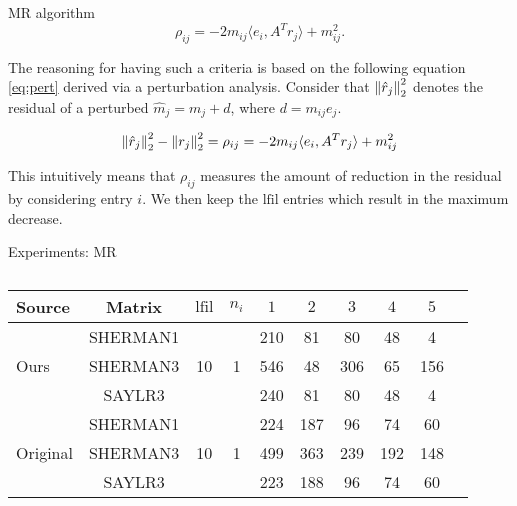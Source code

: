 \documentclass[paper=A4, fontsize=11pt]{scrartcl}
\let\originalleft\left
\let\originalright\right
\renewcommand{\left}{\mathopen{}\mathclose\bgroup\originalleft}
\renewcommand{\right}{\aftergroup\egroup\originalright}
\theoremstyle{remark}
\begin{document}
\begin{section}{MR algorithm}
	\begin{equation}\label{eq:rho}
	\rho_{i j}=-2 m_{i j}\langle e_{i}, A^{T} r_{j}\rangle+m_{i j}^{2}.
	\end{equation}


The reasoning for having such a criteria is based on the following equation \eqref{eq:pert} derived via a perturbation analysis.
Consider that $\left\|\hat{r}_{j}\right\|_{2}^{2}$ denotes the residual of a perturbed $\hat{m}_{j} = m_j + d$, where $d = m_{ij} e_j$.

\begin{equation}\label{eq:pert}
\left\|\hat{r}_{j}\right\|_{2}^{2}-\left\|r_{j}\right\|_{2}^{2}= \rho_{i j} = -2 m_{i j}\langle e_{i}, A^{T} r_{j}\rangle +m_{i j}^{2}
\end{equation}

This intuitively means that $\rho_{i j}$ measures the amount of reduction in the residual by considering entry $i$. We then keep the $\text{lfil}$ entries which result in the maximum decrease.
	
	
\end{section}


\newpage

\begin{section}{Experiments: MR}
	

\begin{table}[h]
	\centering
\begin{tabular}{@{}lc|cc|cccccc@{}}
	\toprule
	Source & Matrix &    $\text{lfil}$ &  $n_{i}$ &   $1$ &  $2$ &  $3$ & $4$ &  $5$ \\ \midrule
	\multirow{3}{*}{Ours} & SHERMAN1 & \multirow{3}{*}{10} & \multirow{3}{*}{1}  & 210 & 81 & 80 & 48 & 4  \\
	
	& SHERMAN3 &  &  & 546 & 48 & 306 & 65 & 156  \\

	& SAYLR3 & & & 240 & 81 & 80 & 48 & 4  \\
		\midrule
	\multirow{3}{*}{Original} & SHERMAN1 & \multirow{3}{*}{10} & \multirow{3}{*}{1} & 224 & 187 & 96 & 74 & 60  \\

& SHERMAN3 &  &  & 499 & 363 & 239 & 192 & 148  \\

& SAYLR3 & & & 223 & 188 & 96 & 74 & 60  \\
	\bottomrule
	\end{tabular}
	\caption{}
\label{tab:chow}
\end{table}


\end{section}
\end{document}

